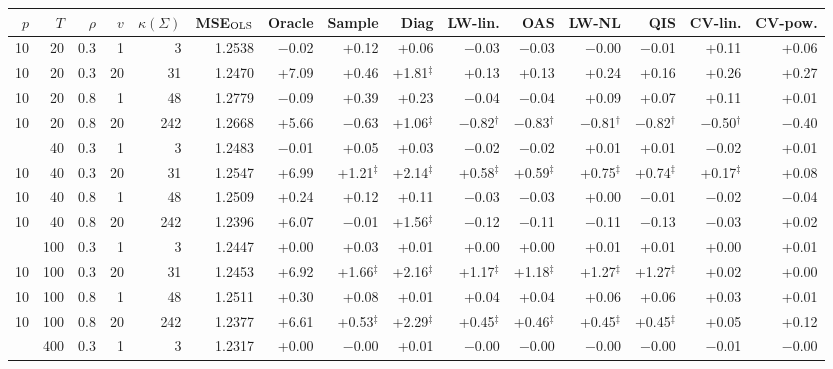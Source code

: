 \begin{tabular}{@{}rrrrr rrrrrrrrrr@{}}
\toprule
$p$ & $T$ & $\rho$ & $v$ & $\kappa(\Sigma)$ & MSE$_{\rm OLS}$ & Oracle & Sample & Diag & LW-lin. & OAS & LW-NL & QIS & CV-lin. & CV-pow. \\
\midrule
10 & 20 & 0.3 & 1 & 3 & 1.2538 & $-$0.02 & +0.12 & +0.06 & $-$0.03 & $-$0.03 & $-$0.00 & $-$0.01 & +0.11 & +0.06 \\
10 & 20 & 0.3 & 20 & 31 & 1.2470 & +7.09 & +0.46 & +1.81$^{\ddagger}$ & +0.13 & +0.13 & +0.24 & +0.16 & +0.26 & +0.27 \\
10 & 20 & 0.8 & 1 & 48 & 1.2779 & $-$0.09 & +0.39 & +0.23 & $-$0.04 & $-$0.04 & +0.09 & +0.07 & +0.11 & +0.01 \\
10 & 20 & 0.8 & 20 & 242 & 1.2668 & +5.66 & $-$0.63 & +1.06$^{\ddagger}$ & $-$0.82$^{\dagger}$ & $-$0.83$^{\dagger}$ & $-$0.81$^{\dagger}$ & $-$0.82$^{\dagger}$ & $-$0.50$^{\dagger}$ & $-$0.40 \\
\addlinespace[1pt]
10 & 40 & 0.3 & 1 & 3 & 1.2483 & $-$0.01 & +0.05 & +0.03 & $-$0.02 & $-$0.02 & +0.01 & +0.01 & $-$0.02 & +0.01 \\
10 & 40 & 0.3 & 20 & 31 & 1.2547 & +6.99 & +1.21$^{\ddagger}$ & +2.14$^{\ddagger}$ & +0.58$^{\ddagger}$ & +0.59$^{\ddagger}$ & +0.75$^{\ddagger}$ & +0.74$^{\ddagger}$ & +0.17$^{\ddagger}$ & +0.08 \\
10 & 40 & 0.8 & 1 & 48 & 1.2509 & +0.24 & +0.12 & +0.11 & $-$0.03 & $-$0.03 & +0.00 & $-$0.01 & $-$0.02 & $-$0.04 \\
10 & 40 & 0.8 & 20 & 242 & 1.2396 & +6.07 & $-$0.01 & +1.56$^{\ddagger}$ & $-$0.12 & $-$0.11 & $-$0.11 & $-$0.13 & $-$0.03 & +0.02 \\
\addlinespace[1pt]
10 & 100 & 0.3 & 1 & 3 & 1.2447 & +0.00 & +0.03 & +0.01 & +0.00 & +0.00 & +0.01 & +0.01 & +0.00 & +0.01 \\
10 & 100 & 0.3 & 20 & 31 & 1.2453 & +6.92 & +1.66$^{\ddagger}$ & +2.16$^{\ddagger}$ & +1.17$^{\ddagger}$ & +1.18$^{\ddagger}$ & +1.27$^{\ddagger}$ & +1.27$^{\ddagger}$ & +0.02 & +0.00 \\
10 & 100 & 0.8 & 1 & 48 & 1.2511 & +0.30 & +0.08 & +0.01 & +0.04 & +0.04 & +0.06 & +0.06 & +0.03 & +0.01 \\
10 & 100 & 0.8 & 20 & 242 & 1.2377 & +6.61 & +0.53$^{\ddagger}$ & +2.29$^{\ddagger}$ & +0.45$^{\ddagger}$ & +0.46$^{\ddagger}$ & +0.45$^{\ddagger}$ & +0.45$^{\ddagger}$ & +0.05 & +0.12 \\
\addlinespace[1pt]
10 & 400 & 0.3 & 1 & 3 & 1.2317 & +0.00 & $-$0.00 & +0.01 & $-$0.00 & $-$0.00 & $-$0.00 & $-$0.00 & $-$0.01 & $-$0.00 \\

\end{tabular}
